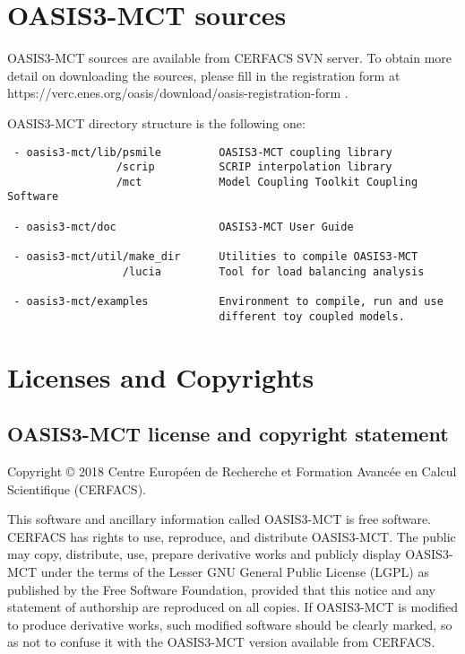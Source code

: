 \section{OASIS3-MCT sources}
\label{sec_Obtaining}
OASIS3-MCT sources are available from CERFACS SVN server. To obtain more detail on downloading
the sources, please fill in the registration form at
https://verc.enes.org/oasis/download/oasis-registration-form .

OASIS3-MCT directory structure is the following one:

\begin{verbatim}
 - oasis3-mct/lib/psmile         OASIS3-MCT coupling library
                 /scrip          SCRIP interpolation library
                 /mct            Model Coupling Toolkit Coupling Software
                  
 - oasis3-mct/doc                OASIS3-MCT User Guide

 - oasis3-mct/util/make_dir      Utilities to compile OASIS3-MCT
                  /lucia         Tool for load balancing analysis

 - oasis3-mct/examples           Environment to compile, run and use
                                 different toy coupled models. 
\end{verbatim}
\newpage
\section{Licenses and Copyrights}
 
\subsection{OASIS3-MCT license and copyright statement}

Copyright © 2018 Centre Europ\'een de Recherche et Formation
Avanc\'ee en Calcul Scientifique (CERFACS).  

This software and ancillary information called OASIS3-MCT is free
software.  CERFACS has rights to use, reproduce, and distribute
OASIS3-MCT. The public may copy, distribute, use, prepare derivative works and
publicly display OASIS3-MCT under the terms of the Lesser GNU General
Public License (LGPL) as published by the Free Software Foundation,
provided that this notice and any statement of authorship are
reproduced on all copies. If OASIS3-MCT is modified to produce derivative
works, such modified software should be clearly marked, so as not to
confuse it with the OASIS3-MCT version available from CERFACS.

